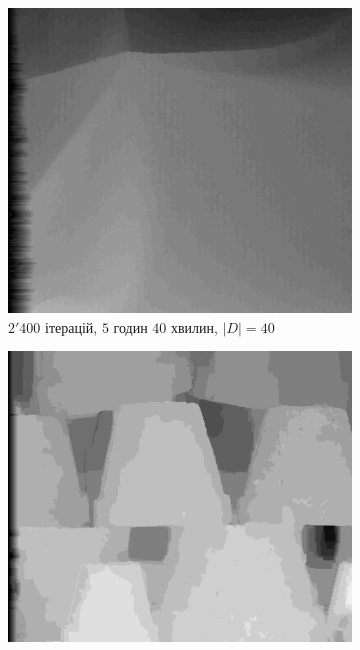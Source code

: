 \begin{figure}[h]
\centering
    \begin{subfigure}[t]{0.32\textwidth}
        \centering
        \includegraphics[width=\textwidth]{images/cloth_pixel_based_stereo}
        \caption{$2'400$ ітерацій, $5$ годин $40$ хвилин, $\left| D \right| = 40$}
        \label{fig:cloth:pixel}
    \end{subfigure}
    \hfill
    \begin{subfigure}[t]{0.32\textwidth}
        \centering
        \includegraphics[width=\textwidth]{images/pots_pixel_based_stereo}

\end{subfigure}
\end{figure}
